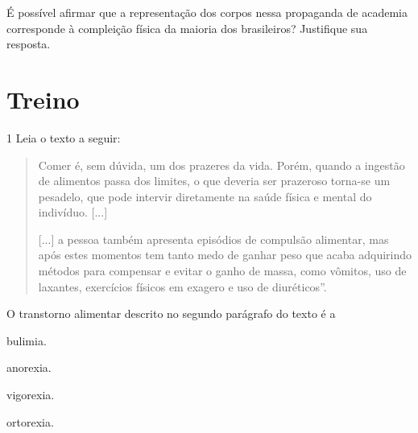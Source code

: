 É possível afirmar que a representação dos corpos nessa propaganda de 
academia corresponde à compleição física da maioria dos brasileiros?
Justifique sua resposta.



\section*{Treino}

\num{1} Leia o texto a seguir:

\begin{quote}
Comer é, sem dúvida, um dos prazeres da vida. Porém, quando a ingestão
de alimentos passa dos limites, o que deveria ser prazeroso torna-se um
pesadelo, que pode intervir diretamente na saúde física e mental do
indivíduo. {[}...{]}

{[}...{]} a pessoa também apresenta episódios de compulsão alimentar,
mas após estes momentos tem tanto medo de ganhar peso que acaba
adquirindo métodos para compensar e evitar o ganho de massa, como
vômitos, uso de laxantes, exercícios físicos em exagero e uso de
diuréticos''.

\end{quote}

O transtorno alimentar descrito no segundo parágrafo do texto é a

\begin{escolha}
\item bulimia.

\item anorexia.

\item vigorexia.

\item ortorexia.
\end{escolha}


